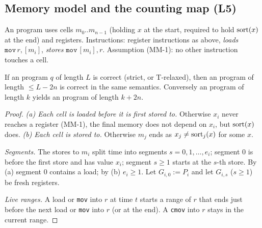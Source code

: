 \subsection{Memory model and the counting map (L5)}
An \MM{} program uses cells $m_0..m_{n-1}$ (holding $x$ at the start, required to hold $\mathrm{sort}(x)$ at the end) and
registers. Instructions: register instructions as above, \emph{loads} $\texttt{mov}\,r,[m_i]$, \emph{stores}
$\texttt{mov}\,[m_i],r$. Assumption (MM-1): no other instruction touches a cell.
\begin{lemma}[L5]
If an \MM{} program $q$ of length $L$ is correct (strict, or T-relaxed), then an \RS{} program of length $\le L-2n$ is
correct in the same semantics. Conversely an \RS{} program of length $k$ yields an \MM{} program of length $k+2n$.
\end{lemma}
\begin{proof}
\emph{(a) Each cell is loaded before it is first stored to.} Otherwise $x_i$ never reaches a register (MM-1), the final
memory does not depend on $x_i$, but $\mathrm{sort}(x)$ does.
\emph{(b) Each cell is stored to.} Otherwise $m_j$ ends as $x_j\neq\mathrm{sort}_j(x)$ for some $x$.

\emph{Segments.} The stores to $m_i$ split time into segments $s=0,1,\dots,e_i$; segment $0$ is before the first store and
has value $x_i$; segment $s\ge1$ starts at the $s$-th store. By (a) segment $0$ contains a load; by (b) $e_i\ge1$.
Let $G_{i,0}:=P_i$ and let $G_{i,s}$ ($s\ge1$) be fresh registers.

\emph{Live ranges.} A load or \texttt{mov} into $r$ at time $t$ starts a range of $r$ that ends just before the next
load or \texttt{mov} into $r$ (or at the end). A \texttt{cmov} into $r$ stays in the current range.


\end{proof}
